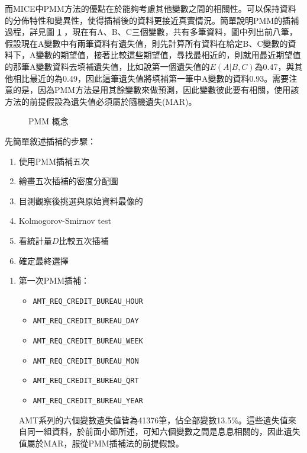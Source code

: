 \documentclass[12pt, a4paper]{article}
\begin{document}
\begin{enumerate}
而MICE中PMM方法的優點在於能夠考慮其他變數之間的相關性。可以保持資料的分佈特性和變異性，使得插補後的資料更接近真實情況。簡單說明PMM的插補過程，詳見圖 \ref{fig:PMM 概念} ，現在有A、B、C三個變數，共有多筆資料，圖中列出前八筆，假設現在A變數中有兩筆資料有遺失值，則先計算所有資料在給定B、C變數的資料下，A變數的期望值，接著比較這些期望值，尋找最相近的，則就用最近期望值的那筆A變數資料去填補遺失值，比如說第一個遺失值的$E(A|B,C)$為0.47，與其他相比最近的為0.49，因此這筆遺失值將填補第一筆中A變數的資料0.93。需要注意的是，因為PMM方法是用其餘變數來做預測，因此變數彼此要有相關，使用該方法的前提假設為遺失值必須屬於隨機遺失(MAR)。

\begin{figure}[h]
    \caption{PMM 概念}
    \label{fig:PMM 概念}
\end{figure}

先簡單敘述插補的步驟：

\begin{enumerate}[-Step 1.]

\item 使用PMM插補五次
\item 繪畫五次插補的密度分配圖
\item 目測觀察後挑選與原始資料最像的
\item Kolmogorov-Smirnov test
\item 看統計量$D$比較五次插補
\item 確定最終選擇

\end{enumerate}
\begin{enumerate}

\item 第一次PMM插補：

\begin{itemize}
\item \verb|AMT_REQ_CREDIT_BUREAU_HOUR|

\item \verb|AMT_REQ_CREDIT_BUREAU_DAY|

\item \verb|AMT_REQ_CREDIT_BUREAU_WEEK|

\item \verb|AMT_REQ_CREDIT_BUREAU_MON|

\item \verb|AMT_REQ_CREDIT_BUREAU_QRT|

\item \verb|AMT_REQ_CREDIT_BUREAU_YEAR|
\end{itemize}
AMT系列的六個變數遺失值皆為41376筆，佔全部變數13.5\%。這些遺失值來自同一組資料，於前面小節所述，可知六個變數之間是息息相關的，因此遺失值屬於MAR，服從PMM插補法的前提假設。


\end{enumerate}
\end{enumerate}
\end{document}
